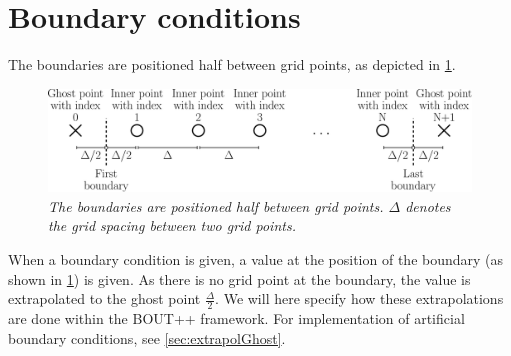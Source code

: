 \section{Boundary conditions}
%
The boundaries are positioned half between grid points, as depicted in \cref{fig:flatBC}.
%
\begin{figure}[htb]
    \centering
    \includegraphics[width=1.0\textwidth]{fig/flatGrid}
    \caption{\textit{
            The boundaries are positioned half between grid points.
            $\Delta$ denotes the grid spacing between two grid points.
        }}
    \label{fig:flatBC}
\end{figure}
%
When a boundary condition is given, a value at the position of the boundary (as shown in \cref{fig:flatBC}) is given.
As there is no grid point at the boundary, the value is extrapolated to the ghost point $\frac{\Delta}{2}$.
We will here specify how these extrapolations are done within the BOUT++ framework.
For implementation of artificial boundary conditions, see \cref{sec:extrapolGhost}.

